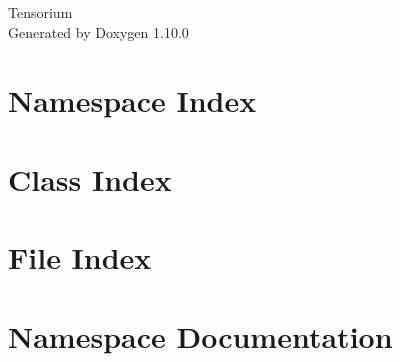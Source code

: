 \documentclass[twoside]{book}
\newcommand{\+}{\discretionary{\mbox{\scriptsize$\hookleftarrow$}}{}{}}
\newcommand{\clearemptydoublepage}{%
    \newpage{\pagestyle{empty}\cleardoublepage}%
  }
\begin{document}
  \raggedbottom
    \hypersetup{pageanchor=false,
                bookmarksnumbered=true,
                pdfencoding=unicode
               }
  \begin{titlepage}
  \vspace*{7cm}
  \begin{center}%
  {\Large Tensorium}\\
  \vspace*{1cm}
  {\large Generated by Doxygen 1.10.0}\\
  \end{center}
  \end{titlepage}
  \clearemptydoublepage
  \tableofcontents
  \clearemptydoublepage
  \hypersetup{pageanchor=true}

\chapter{Namespace Index}

\chapter{Class Index}

\chapter{File Index}

\chapter{Namespace Documentation}






\end{document}

